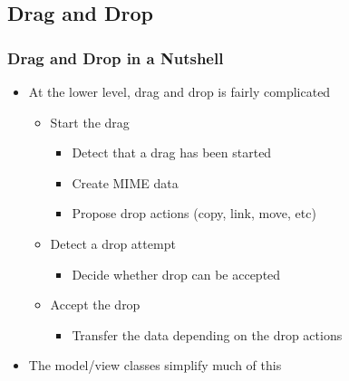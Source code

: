 %
%
%
%

\subsection{Drag and Drop}

\begin{slide}\frametitle{Drag and Drop in a Nutshell}
  \begin{itemize}
  \item At the lower level, drag and drop is fairly complicated
    \begin{itemize}
    \item Start the drag
      \begin{itemize}
      \item Detect that a drag has been started
      \item Create MIME data
      \item Propose drop actions (copy, link, move, etc)
      \end{itemize}
    \item Detect a drop attempt
      \begin{itemize}
      \item Decide whether drop can be accepted
      \end{itemize}
    \item Accept the drop
      \begin{itemize}
      \item Transfer the data depending on the drop actions
      \end{itemize}
    \end{itemize}
  \medskip
  \item The model/view classes simplify much of this
  \end{itemize}
\end{slide}

